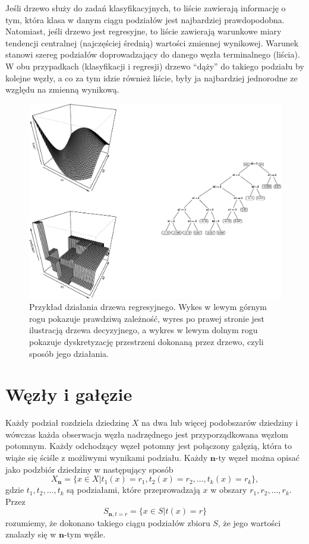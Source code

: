 \documentclass[
]{book}
\theoremstyle{plain}
\theoremstyle{definition}
\theoremstyle{definition}
\theoremstyle{definition}
\theoremstyle{definition}
\theoremstyle{definition}
\theoremstyle{remark}
\begin{document}
Jeśli drzewo służy do zadań klasyfikacyjnych, to liście zawierają informację o tym, która klasa w danym ciągu podziałów jest najbardziej prawdopodobna. Natomiast, jeśli drzewo jest regresyjne, to liście zawierają warunkowe miary tendencji centralnej (najczęściej średnią) wartości zmiennej wynikowej. Warunek stanowi szereg podziałów doprowadzający do danego węzła terminalnego (liścia). W obu przypadkach (klasyfikacji i regresji) drzewo ``dąży'' do takiego podziału by kolejne węzły, a co za tym idzie również liście, były ja najbardziej jednorodne ze względu na zmienną wynikową.

\begin{figure}
\centering
\includegraphics{EksploracjaDanych_files/figure-latex/unnamed-chunk-11-1.pdf}
\caption{\label{fig:unnamed-chunk-11}Przykład działania drzewa regresyjnego. Wykes w lewym górnym rogu pokazuje prawdziwą zależność, wyres po prawej stronie jest ilustracją drzewa decyzyjnego, a wykres w lewym dolnym rogu pokazuje dyskretyzację przestrzeni dokonaną przez drzewo, czyli sposób jego działania.}
\end{figure}

\section{Węzły i gałęzie}\label{wux119zux142y-i-gaux142ux119zie}

Każdy podział rozdziela dziedzinę \(X\) na dwa lub więcej podobszarów dziedziny i wówczas każda obserwacja węzła nadrzędnego jest przyporządkowana węzłom potomnym. Każdy odchodzący węzeł potomny jest połączony gałęzią, która to wiąże się ściśle z możliwymi wynikami podziału. Każdy \(\mathbf{n}\)-ty węzeł można opisać jako podzbiór dziedziny w następujący sposób
\begin{equation}
    X_{\mathbf{n}}=\{x\in X|t_1(x)=r_1,t_2(x)=r_2,\ldots,t_k(x)=r_k\},
\end{equation}
gdzie \(t_1,t_2,\ldots,t_k\) są podziałami, które przeprowadzają \(x\) w obszary \(r_1, r_2,\ldots, r_k\). Przez
\begin{equation}
    S_{\mathbf{n}, t=r}=\{x\in S|t(x)=r\}
\end{equation}
rozumiemy, że dokonano takiego ciągu podziałów zbioru \(S\), że jego wartości znalazły się w \(\mathbf{n}\)-tym węźle.
\end{document}
